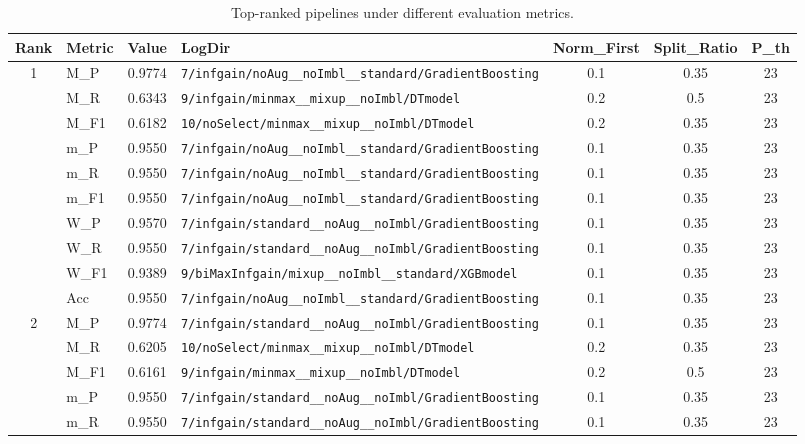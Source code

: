 \begin{table}[htbp]
\caption{Top-ranked pipelines under different evaluation metrics.}
\label{tab:rank_metric_vertical}
\centering
\small
\setlength{\tabcolsep}{4pt}
\begin{tabular}{|c|l|c|>{\ttfamily\footnotesize}p{7.2cm}|c|c|c|}
\hline
Rank & Metric & Value & LogDir & Norm\_First & Split\_Ratio & P\_th \\
\hline
\multirow{10}{*}{1} & M\_P & 0.9774 & \texttt{7/infgain/noAug\_\_noImbl\_\_standard/GradientBoosting} & 0.1 & 0.35  & 23 \\ 
 & M\_R & 0.6343 & \texttt{9/infgain/minmax\_\_mixup\_\_noImbl/DTmodel} & 0.2 & 0.5  & 23 \\ 
 & M\_F1 & 0.6182 & \texttt{10/noSelect/minmax\_\_mixup\_\_noImbl/DTmodel} & 0.2 & 0.35  & 23 \\ 
 & m\_P & 0.9550 & \texttt{7/infgain/noAug\_\_noImbl\_\_standard/GradientBoosting} & 0.1 & 0.35  & 23 \\ 
 & m\_R & 0.9550 & \texttt{7/infgain/noAug\_\_noImbl\_\_standard/GradientBoosting} & 0.1 & 0.35  & 23 \\ 
 & m\_F1 & 0.9550 & \texttt{7/infgain/noAug\_\_noImbl\_\_standard/GradientBoosting} & 0.1 & 0.35  & 23 \\ 
 & W\_P & 0.9570 & \texttt{7/infgain/standard\_\_noAug\_\_noImbl/GradientBoosting} & 0.1 & 0.35  & 23 \\ 
 & W\_R & 0.9550 & \texttt{7/infgain/standard\_\_noAug\_\_noImbl/GradientBoosting} & 0.1 & 0.35  & 23 \\ 
 & W\_F1 & 0.9389 & \texttt{9/biMaxInfgain/mixup\_\_noImbl\_\_standard/XGBmodel} & 0.1 & 0.35  & 23 \\ 
 & Acc & 0.9550 & \texttt{7/infgain/noAug\_\_noImbl\_\_standard/GradientBoosting} & 0.1 & 0.35  & 23 \\ 
\hline
\multirow{10}{*}{2} & M\_P & 0.9774 & \texttt{7/infgain/standard\_\_noAug\_\_noImbl/GradientBoosting} & 0.1 & 0.35  & 23 \\ 
 & M\_R & 0.6205 & \texttt{10/noSelect/minmax\_\_mixup\_\_noImbl/DTmodel} & 0.2 & 0.35  & 23 \\ 
 & M\_F1 & 0.6161 & \texttt{9/infgain/minmax\_\_mixup\_\_noImbl/DTmodel} & 0.2 & 0.5  & 23 \\ 
 & m\_P & 0.9550 & \texttt{7/infgain/standard\_\_noAug\_\_noImbl/GradientBoosting} & 0.1 & 0.35  & 23 \\ 
 & m\_R & 0.9550 & \texttt{7/infgain/standard\_\_noAug\_\_noImbl/GradientBoosting} & 0.1 & 0.35  & 23 \\ 

\end{tabular}
\end{table}
